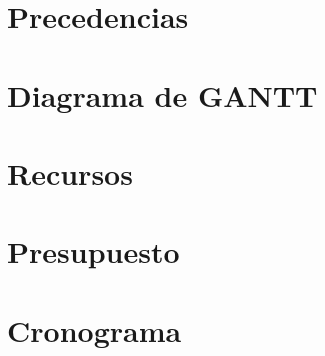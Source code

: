 \section{Precedencias}
%
\newpage%
\section{Diagrama de GANTT}
%
\mbox{}
\newpage%
%
\mbox{}
\newpage%
%
\section{Recursos}
%
\mbox{}
\newpage%
\mbox{}
\newpage%
\mbox{}
\newpage%
\mbox{}
\newpage%
\section{Presupuesto}
%
\mbox{}
\newpage%
%
\mbox{}
\newpage%
%
\section{Cronograma}
%
\mbox{}
\newpage%
\mbox{}
\newpage%
\mbox{}
\newpage%
\mbox{}
\newpage%